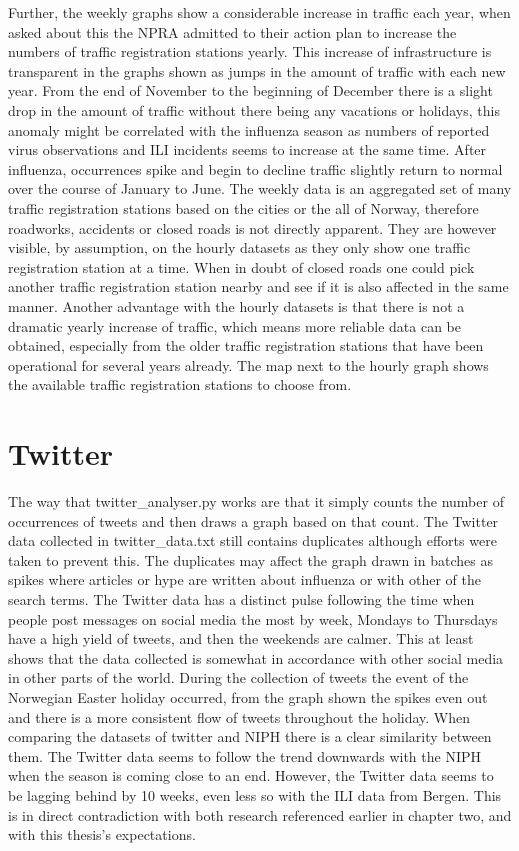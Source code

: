 Further, the weekly graphs show a considerable increase in traffic each year, when asked about this the NPRA admitted to their action plan to increase the numbers of traffic registration stations yearly. This increase of infrastructure is transparent in the graphs shown as jumps in the amount of traffic with each new year. From the end of November to the beginning of December there is a slight drop in the amount of traffic without there being any vacations or holidays, this anomaly might be correlated with the influenza season as numbers of reported virus observations and ILI incidents seems to increase at the same time. After influenza, occurrences spike and begin to decline traffic slightly return to normal over the course of January to June.
The weekly data is an aggregated set of many traffic registration stations based on the cities or the all of Norway, therefore roadworks, accidents or closed roads is not directly apparent. They are however visible, by assumption, on the hourly datasets as they only show one traffic registration station at a time. When in doubt of closed roads one could pick another traffic registration station nearby and see if it is also affected in the same manner. Another advantage with the hourly datasets is that there is not a dramatic yearly increase of traffic, which means more reliable data can be obtained, especially from the older traffic registration stations that have been operational for several years already. The map next to the hourly graph shows the available traffic registration stations to choose from.




\section{Twitter}
The way that twitter\_analyser.py works are that it simply counts the number of occurrences of tweets and then draws a graph based on that count. The Twitter data collected in twitter\_data.txt still contains duplicates although efforts were taken to prevent this. The duplicates may affect the graph drawn in batches as spikes where articles or hype are written about influenza or with other of the search terms. The Twitter data has a distinct pulse following the time when people post messages on social media the most by week\cite{socialTrend}, Mondays to Thursdays have a high yield of tweets, and then the weekends are calmer. This at least shows that the data collected is somewhat in accordance with other social media in other parts of the world. During the collection of tweets the event of the Norwegian Easter holiday occurred, from the graph shown the spikes even out and there is a more consistent flow of tweets throughout the holiday.
When comparing the datasets of twitter and NIPH there is a clear similarity between them. The Twitter data seems to follow the trend downwards with the NIPH when the season is coming close to an end. However, the Twitter data seems to be lagging behind by 10 weeks, even less so with the ILI data from Bergen. This is in direct contradiction with both research referenced earlier in chapter two, and with this thesis's expectations.





